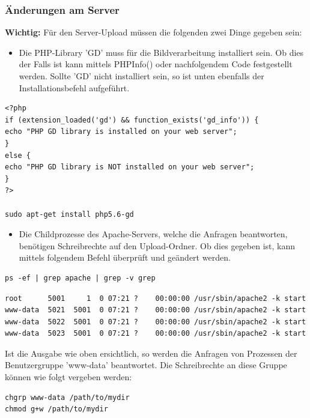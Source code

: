 \subsubsection{Änderungen am Server}
\textbf{Wichtig:} 
Für den Server-Upload müssen die folgenden zwei Dinge gegeben sein:
\begin{itemize}
	\item Die PHP-Library 'GD' muss für die Bildverarbeitung installiert sein. Ob dies der Falls ist kann mittels PHPInfo() oder nachfolgendem Code festgestellt werden. \cite{zoopable.com} Sollte 'GD' nicht installiert sein, so ist unten ebenfalls der Installationsbefehl aufgeführt. \cite{askubuntu.com_php_extension}
\end{itemize}
\begin{lstlisting}
<?php
if (extension_loaded('gd') && function_exists('gd_info')) {
echo "PHP GD library is installed on your web server";
}
else {
echo "PHP GD library is NOT installed on your web server";
}
?>

sudo apt-get install php5.6-gd
\end{lstlisting}

\begin{itemize}
	\item Die Childprozesse des Apache-Servers, welche die Anfragen beantworten, benötigen Schreibrechte auf den Upload-Ordner. Ob dies gegeben ist, kann mittels folgendem Befehl überprüft und geändert werden. \cite{askubuntu.com_permissions} 
\end{itemize}
\begin{lstlisting}
ps -ef | grep apache | grep -v grep
\end{lstlisting}

\begin{lstlisting}
root      5001     1  0 07:21 ?    00:00:00 /usr/sbin/apache2 -k start
www-data  5021  5001  0 07:21 ?    00:00:00 /usr/sbin/apache2 -k start
www-data  5022  5001  0 07:21 ?    00:00:00 /usr/sbin/apache2 -k start
www-data  5023  5001  0 07:21 ?    00:00:00 /usr/sbin/apache2 -k start
\end{lstlisting}

Ist die Ausgabe wie oben ersichtlich, so werden die Anfragen von Prozessen der Benutzergruppe 'www-data' beantwortet. Die Schreibrechte an diese Gruppe können wie folgt vergeben werden:
\begin{lstlisting}
chgrp www-data /path/to/mydir
chmod g+w /path/to/mydir
\end{lstlisting}




